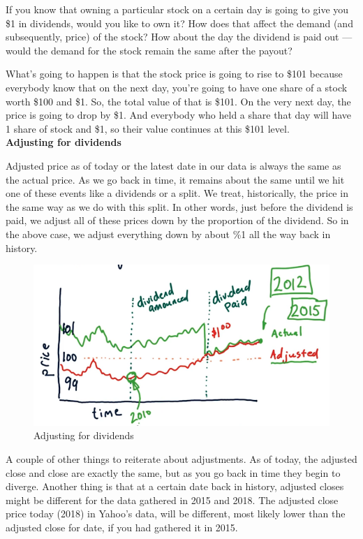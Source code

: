 \documentclass[12pt]{article}
\begin{document}
If you know that owning a particular stock on a certain day is going to give you \$1 in dividends, would you like to own it? How does that affect the demand (and subsequently, price) of the stock? How about the day the dividend is paid out --- would the demand for the stock remain the same after the payout?

What's going to happen is that the stock price is going to rise to \$101 because everybody know that on the next day, you're going to have one share of a stock worth \$100 and \$1. So, the total value of that is \$101. On the very next day, the price is going to drop by \$1. And everybody who held a share that day will have 1 share of stock and \$1, so their value continues at this \$101 level. \\[8pt]
\noindent
\textbf{Adjusting for dividends} 

Adjusted price as of today or the latest date in our data is always the same as the actual price. As we go back in time, it remains about the same until we hit one of these events like a dividends or a split. We treat, historically, the price in the same way as we do with this split. In other words, just before the dividend is paid, we adjust all of these prices down by the proportion of the dividend. So in the above case, we adjust everything down by about \%1 all the way back in history. 

\begin{figure}[!ht]
\centering
\includegraphics[scale=0.45]{fig/fig53}
\caption{Adjusting for dividends}
\end{figure}

A couple of other things to reiterate about adjustments. As of today, the adjusted close and close are exactly the same, but as you go back in time they begin to diverge. Another thing is that at a certain date back in history, adjusted closes might be different for the data gathered in 2015 and 2018. The adjusted close price today (2018) in Yahoo's data, will be different, most likely lower than the adjusted close for date, if you had gathered it in 2015. 
\end{document}
